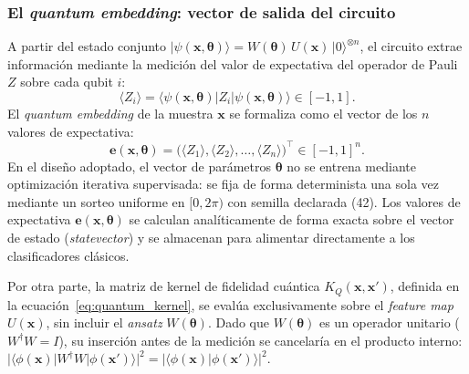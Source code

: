 
\subsubsection{El \textit{quantum embedding}: vector de salida del circuito}
\label{sec:quantum_embedding}

A partir del estado conjunto $|\psi(\mathbf{x}, \boldsymbol{\theta})\rangle = W(\boldsymbol{\theta})\,U(\mathbf{x})\,|0\rangle^{\otimes n}$,
el circuito extrae información mediante la medición del valor de expectativa del operador de Pauli $Z$ sobre cada qubit $i$:
\begin{equation}
  \langle Z_i \rangle = \langle \psi(\mathbf{x}, \boldsymbol{\theta}) | Z_i | \psi(\mathbf{x}, \boldsymbol{\theta}) \rangle \in [-1, 1].
  \label{eq:expval}
\end{equation}
El \textit{quantum embedding} de la muestra $\mathbf{x}$ se formaliza como el vector
de los $n$ valores de expectativa:
\begin{equation}
  \mathbf{e}(\mathbf{x}, \boldsymbol{\theta}) = \bigl(\langle Z_1 \rangle, \langle Z_2 \rangle, \dots, \langle Z_n \rangle\bigr)^\top \in [-1, 1]^n.
  \label{eq:embedding_vector}
\end{equation}
En el diseño adoptado, el vector de parámetros
$\boldsymbol{\theta}$ no se entrena mediante optimización iterativa supervisada: se fija
de forma determinista una sola vez mediante un sorteo uniforme en $[0, 2\pi)$ con
semilla declarada (42). Los valores de expectativa $\mathbf{e}(\mathbf{x}, \boldsymbol{\theta})$
se calculan analíticamente de forma exacta sobre el vector de estado (\textit{statevector})
y se almacenan para alimentar directamente a los clasificadores clásicos.

Por otra parte, la matriz de kernel de fidelidad cuántica $K_Q(\mathbf{x}, \mathbf{x}')$, definida en la ecuación~\eqref{eq:quantum_kernel}, se evalúa exclusivamente sobre el \textit{feature map} $U(\mathbf{x})$, sin incluir el \textit{ansatz} $W(\boldsymbol{\theta})$. Dado que $W(\boldsymbol{\theta})$ es un operador unitario ($W^\dagger W = I$), su inserción antes de la medición se cancelaría en el producto interno: $|\langle \phi(\mathbf{x}) | W^\dagger W | \phi(\mathbf{x}') \rangle|^2 = |\langle \phi(\mathbf{x}) | \phi(\mathbf{x}') \rangle|^2$.

